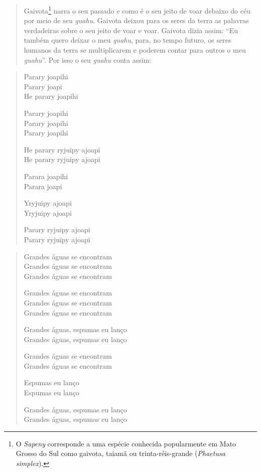 \begin{itemize}
\begin{quote}
Gaivota\footnote{O \emph{Sapeny} corresponde a uma espécie conhecida
  popularmente em Mato Grosso do Sul como gaivota, taiamã ou
  trinta-réis-grande (\emph{Phaetusa simplex}).} narra o seu passado e
como é o seu jeito de voar debaixo do céu por meio de seu \emph{guahu}.
Gaivota deixou para os seres da terra as palavras verdadeiras sobre o
seu jeito de voar e voar. Gaivota dizia assim: ``Eu também quero deixar
o meu \emph{guahu}, para, no tempo futuro, os seres humanos da terra se
multiplicarem e poderem contar para outros o meu \emph{guahu}''. Por
isso o seu \emph{guahu} conta assim:
\end{quote}

\begin{verse}
Parary joapihi\\
Parary joapi\\
He parary joapihi

Parary joapihi\\
Parary joapihi\\
Parary joapihi

He parary ryjuipy ajoapi\\
He parary ryjuipy ajoapi

Parara joapihi\\
Parara joapi

Yryjuipy ajoapi\\
Yryjuipy ajoapi

Parary ryjuipy ajoapi\\
Parary ryjuipy ajoapi
\end{verse}

\begin{verse}
Grandes águas se encontram\\
Grandes águas se encontram\\
Grandes águas se encontram

Grandes águas se encontram\\
Grandes águas se encontram\\
Grandes águas se encontram

Grandes águas, espumas eu lanço\\
Grandes águas, espumas eu lanço

Grandes águas se encontram\\
Grandes águas se encontram

Espumas eu lanço\\
Espumas eu lanço

Grandes águas, espumas eu lanço\\
Grandes águas, espumas eu lanço
\end{verse}


\end{itemize}
